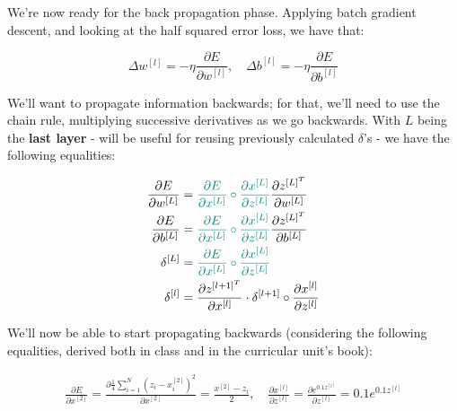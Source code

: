 \documentclass[12pt]{article}
\begin{document}
\begin{enumerate}[leftmargin=\labelsep]
        We're now ready for the back propagation phase. Applying batch gradient descent,
        and looking at the half squared error loss, we have that:

        \begin{equation*}
          \Delta w^{[l]} = - \eta \frac{\partial E}{\partial w^{[l]}}, \quad
          \Delta b^{[l]} = - \eta \frac{\partial E}{\partial b^{[l]}}
        \end{equation*}

        We'll want to propagate information backwards; for that, we'll need to use
        the chain rule, multiplying successive derivatives as we go backwards.
        With $L$ being the \textbf{last layer} - will be useful for reusing previously
        calculated $\delta$'s - we have the following equalities:

        \begin{align*}
          \frac{\partial E}{\partial w^{[L]}} & = \textcolor{teal}{\frac{\partial E}{\partial x^{[L]}} \circ
            \frac{\partial x^{[L]}}{\partial z^{[L]}}}
          \frac{\partial z^{[L]^T}}{\partial w^{[L]}}                                                        \\
          \frac{\partial E}{\partial b^{[L]}} & = \textcolor{teal}{\frac{\partial E}{\partial x^{[L]}} \circ
            \frac{\partial x^{[L]}}{\partial z^{[L]}}}
          \frac{\partial z^{[L]^T}}{\partial b^{[L]}}                                                        \\
          \delta^{[L]}                        & = \textcolor{teal}{\frac{\partial E}{\partial x^{[L]}} \circ
          \frac{\partial x^{[L]}}{\partial z^{[L]}}}                                                         \\
          \delta^{[l]}                        & =
          \frac{\partial z^{[l + 1]^T}}{\partial x^{[l]}} \cdot \delta^{[l + 1]} \circ \frac{\partial x^{[l]}}{\partial z^{[l]}}
        \end{align*}

        \pagebreak

        We'll now be able to start propagating backwards (considering the following equalities,
        derived both in class and in the curricular unit's book):


        \begin{equation*}
          \begin{aligned}
            \frac{\partial E}{\partial x^{[2]}} = \frac{\partial \frac{1}{4}\sum_{i=1}^N (z_i - x_i^{[2]})^2}{\partial x^{[2]}} = \frac{x^{[2]} - z_i}{2}, \quad
            \frac{\partial x^{[l]}}{\partial z^{[l]}} = \frac{\partial e^{0.1z^{[l]}}}{\partial z^{[l]}} = 0.1e^{0.1z^{[l]}}
          \end{aligned}
        \end{equation*}


\end{enumerate}
\end{document}
